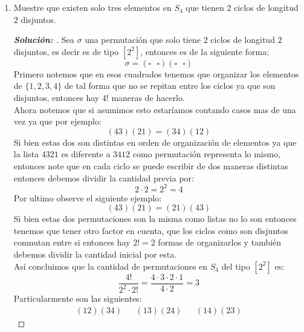 \documentclass[12pt]{article}
\begin{document}
\begin{enumerate}
    \item Muestre que existen solo tres elementos en $S_4$ que tienen $2$ ciclos de longitud $2$ disjuntos. 
    \begin{proof}[\textbf{Solución: }] Sea $\sigma$ una permutación que solo tiene $2$ ciclos de longitud $2$ disjuntos, es decir es de tipo $[2^2]$, entonces es de la siguiente forma:
    $$\sigma=(\square\text{ }\square)(\square\text{ }\square)$$
    Primero notemos que en esos cuadrados tenemos que organizar los elementos de $\{1,2,3,4\}$ de tal forma que no se repitan entre los ciclos ya que son disjuntos, entonces hay $4!$ maneras de hacerlo.\\
    Ahora notemos que si asumimos esto estaríamos contando casos mas de una vez ya que por ejemplo:
    $$(43)(21)=(34)(12)$$
    Si bien estas dos son distintas en orden de organización de elementos ya que la lista $4321$ es diferente a $3412$ como permutación representa lo mismo, entonces note que en cada ciclo se puede escribir de dos maneras distintas entonces debemos dividir la cantidad previa por:
    $$2\cdot2=2^2=4$$
    Por ultimo observe el siguiente ejemplo:
    $$(43)(21)=(21)(43)$$
    Si bien estas dos permutaciones son la misma como listas no lo son entonces tenemos que tener otro factor en cuenta, que los ciclos como son disjuntos conmutan entre si entonces hay $2!=2$ formas de organizarlos y también debemos dividir la cantidad inicial por esta.\\
    \hfill
    Así concluimos que la cantidad de permutaciones en $S_4$ del tipo $[2^2]$ es:
    $$\frac{4!}{2^2\cdot2!}=\frac{4\cdot3\cdot2\cdot1}{4\cdot2}=3$$
    Particularmente son las siguientes:
    $$\begin{matrix}
        &(12)(34)&
        &(13)(24)&
        &(14)(23)&
    \end{matrix}$$
    \end{proof}


\end{enumerate}
\end{document}

